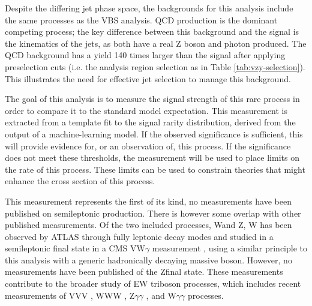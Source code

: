 Despite the differing jet phase space, the backgrounds for this analysis include
the same processes as the \ac{VBS} \Zy analysis. \ac{QCD} \Zyjj production is the dominant
competing process; the key difference between this background and the signal
is the kinematics of the jets, as both have a real Z boson and photon produced.
%
The QCD \Zy background has a yield 140 times larger than the signal after
applying preselection cuts (i.e. the analysis region selection as in Table
\ref{tab:vzy-selection}).  This illustrates the need for effective jet selection
to manage this background.

The goal of this analysis is to measure the signal strength of this rare
process in order to compare it to the standard model expectation.  This
measurement is extracted from a template fit to the signal rarity
distribution, derived from the output of a machine-learning model. If the
observed significance is sufficient, this will provide evidence for, or an
observation of, this process. If the significance does not meet these
thresholds, the measurement will be used to place limits on the rate of this
process. These limits can be used to constrain theories that might enhance the
cross section of this process.

This measurement represents the first of its kind, no measurements have been
published on semileptonic \VZy production. There is however some overlap with
other published measurements. Of the two included processes, W\Zy and Z\Zy, W\Zy
has been observed by \ac{ATLAS} through fully leptonic decay modes
\cite{ATLASwzy2023} and studied in a semileptonic final state in a \ac{CMS}
VW$\gamma$ measurement \cite{CMSvwy2014}, using a similar principle to this
analysis with a generic hadronically decaying massive boson. However, no
measurements have been published of the Z\Zy final state. These measurements
contribute to the broader study of \ac{EW} triboson processes, which includes
recent measurements of
VVV \cite{CMSvvv2020}, 
WWW \cite{ATLASwww2022},
Z$\gamma\gamma$ \cite{ATLASzyy2023,CMSwyyzyy2021},
and W$\gamma\gamma$ \cite{ATLASwyy2023,CMSwyyzyy2021}
processes.

%   

